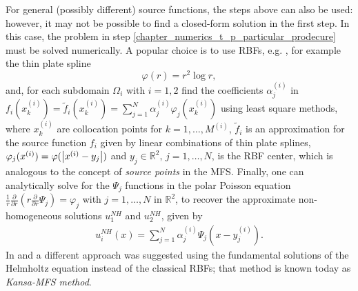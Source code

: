 \begin{remark}
    For general (possibly different) source functions, the steps above can also be used: however, it may not be possible to find a closed-form solution in the first step. In this case, the problem in step \ref{chapter_numerics_t_p_particular_prodecure} must be solved numerically. A popular choice is to use \acp{RBF}, e.g. \cite{golberg1996improved}, for example the thin plate spline
    \[
        \varphi(r) = r^2 \log r,     
    \]
    and, for each subdomain \(\Omega_i\) with \(i=1,2\) find the coefficients \(\alpha_j^{(i)}\) in \(f_i(x_k^{(i)}) =\tilde{f}_i(x_k^{(i)}) = \sum_{j=1}^{N} \alpha_j^{(i)} \varphi_j(x_k^{(i)})\) using least square methods, where \(x_k^{(i)}\) are collocation points for \(k=1,\dots,M^{(i)}\), \(\tilde{f}_i\) is an approximation for the source function \(f_i\) given by linear combinations of thin plate splines, \(\varphi_j(x^{(i)}) = \varphi(\abs{x^{(i)}-y_j})\) and \(y_j \in \mathbb{R}^2, \, j =1,\dots, N\), is the \ac{RBF} center, which is analogous to the concept of \textit{source points} in the \ac{MFS}. Finally, one can analytically solve for the \(\Psi_j\) functions in the polar Poisson equation \(\frac{1}{r}\frac{\partial}{\partial r}\left(r \frac{\partial}{\partial r}\Psi_j\right)  = \varphi_j\) with \(j=1,\dots,N\) in \(\mathbb{R}^2\), to recover the approximate non-homogeneous solutions \(u_1^{NH}\) and \(u_2^{NH}\), given by
    \begin{align*}
        u_i^{NH}(x) = \sum_{j=1}^{N} \alpha_j^{(i)} \Psi_j(x-y_j^{(i)}).
    \end{align*}
    In \cite{alves2005new} and \cite{alves2021domain} a different approach was suggested using the fundamental solutions of the Helmholtz equation instead of the classical \acp{RBF}; that method is known today as \textit{Kansa-MFS method}.
\end{remark}

